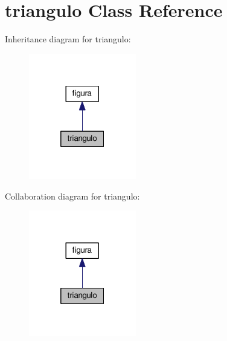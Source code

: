 \hypertarget{classtriangulo}{}\section{triangulo Class Reference}
\label{classtriangulo}


Inheritance diagram for triangulo\+:\nopagebreak
\begin{figure}[H]
\begin{center}
\leavevmode
\includegraphics[width=133pt]{classtriangulo__inherit__graph}
\end{center}
\end{figure}


Collaboration diagram for triangulo\+:\nopagebreak
\begin{figure}[H]
\begin{center}
\leavevmode
\includegraphics[width=133pt]{classtriangulo__coll__graph}
\end{center}
\end{figure}
